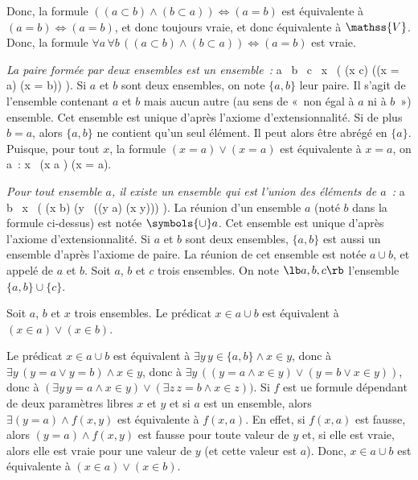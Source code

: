     Donc, la formule $((a \subset b) \wedge (b \subset a)) \Leftrightarrow (a = b)$ est équivalente à $(a = b) \Leftrightarrow (a = b)$, et donc toujours vraie, et donc équivalente à $\mathss{V}$. 
    Donc, la formule $\forall a \, \forall b \, ((a \subset b) \wedge (b \subset a)) \Leftrightarrow (a = b)$ est vraie. 

    \done

\blank[medium]

\noindent\emph{ La paire formée par deux ensembles est un ensemble :}
\startformula
    \forall a \, \forall b \, \exists c \, \forall x \, (
        (x \in c) \Leftrightarrow ((x = a) \vee (x = b))
    ).
\stopformula
Si $a$ et $b$ sont deux ensembles, on note $\lbrace a, b \rbrace$ leur paire. 
Il s'agit de l'ensemble contenant $a$ et $b$ mais aucun autre (au sens de « non égal à $a$ ni à $b$ ») ensemble. 
Cet ensemble est unique d'après l'axiome d'extensionnalité.
Si de plus $b = a$, alors $\lbrace a, b \rbrace$ ne contient qu'un seul élément. 
Il peut alors être abrégé en $\lbrace a \rbrace$. 
Puisque, pour tout $x$, la formule $(x = a) \vee (x=a)$ est équivalente à $x = a$, on a : 
\startformula
    \forall x \, (x \in \lbrace a \rbrace) \Leftrightarrow (x = a). 
\stopformula

\blank[medium]

\noindent\emph{ Pour tout ensemble $a$, il existe un ensemble qui est l'union des éléments de $a$ :}
\startformula
    \forall a \, \exists b \, \forall x \, (
        (x \in b) \Leftrightarrow (\exists y \, ((y \in a) \wedge (x \in y)))
    ).
\stopformula
La réunion d'un ensemble $a$ (noté $b$ dans la formule ci-dessus) est notée $\symbols{\cup} a$.
Cet ensemble est unique d'après l'axiome d'extensionnalité.
Si $a$ et $b$ sont deux ensembles, $\lbrace a, b \rbrace$ est aussi un ensemble d'après l'axiome de paire. 
La réunion de cet ensemble est notée $a \cup b$, et appelé \emph{} de $a$ et $b$. 
Soit $a$, $b$ et $c$ trois ensembles. 
On note $\lb a, b, c \rb$ l'ensemble $\lbrace a, b \rbrace \cup \lbrace c \rbrace$. 

\blank[medium]

\noindent{} Soit $a$, $b$ et $x$ trois ensembles. 
    Le prédicat $x \in a \cup b$ est équivalent à $(x \in a) \vee (x \in b)$.

\blank[medium]

\noindent{} 
    Le prédicat $x \in a \cup b$ est équivalent à $\exists y \, y \in \lbrace a, b \rbrace \wedge x \in y$, donc à $\exists y \, (y = a \vee y = b) \wedge x \in y$, donc à $\exists y \, ((y = a \wedge x \in y) \vee (y = b \vee x \in y))$, donc à $(\exists y \, y = a \wedge x \in y) \vee (\exists z \, z = b \wedge x \in z))$.
    Si $f$ est ue formule dépendant de deux paramètres libres $x$ et $y$ et si $a$ est un ensemble, alors $\exists (y = a) \wedge f(x,y)$ est équivalente à $f(x,a)$.
    En effet, si $f(x,a)$ est fausse, alors $(y = a) \wedge f(x,y)$ est fausse pour toute valeur de $y$ et, si elle est vraie, alors elle est vraie pour une valeur de $y$ (et cette valeur est $a$). 
    Donc, $x \in a \cup b$ est équivalente à $(x \in a) \vee (x \in b)$.

